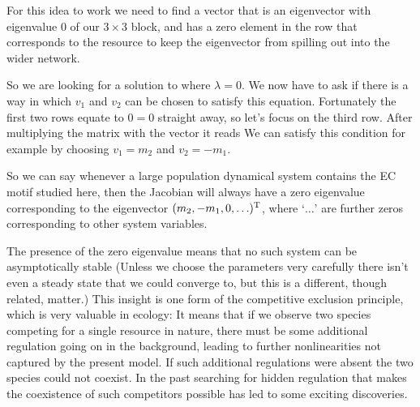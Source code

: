 For this idea to work we need to find a vector that is an eigenvector with eigenvalue 0 of our $3 \times 3$ block, and has a zero element in the row that corresponds to the resource to keep the eigenvector from spilling out into the wider network. 

So we are looking for a solution to 
where $\lambda=0$. We now have to ask if there is a way in which $v_1$ and $v_2$ can be chosen to satisfy this equation. Fortunately the first two rows equate to $0=0$ straight away, so let's focus on the third row. After multiplying the matrix with the vector it reads
We can satisfy this condition for example by choosing $v_1=m_2$ and $v_2=-m_1$.

So we can say whenever a large population dynamical system contains the EC motif studied here, then the Jacobian will always have a zero eigenvalue corresponding to the eigenvector $(m_2,-m_1,0,\ldots)^{\rm T}$, where `$\ldots$' are further zeros corresponding to other system variables.

The presence of the zero eigenvalue means that no such system can be asymptotically stable (Unless we choose the parameters very carefully there isn't even a steady state that we could converge to, but this is a different, though related, matter.) This insight is one form of the competitive exclusion principle, which is very valuable in ecology: It means that if we observe two species competing for a single resource in nature, there must be some additional regulation going on in the background, leading to further nonlinearities not captured by the present model. If such additional regulations were absent the two species could not coexist. In the past searching for hidden regulation that makes the coexistence of such competitors possible has led to some exciting discoveries. 
